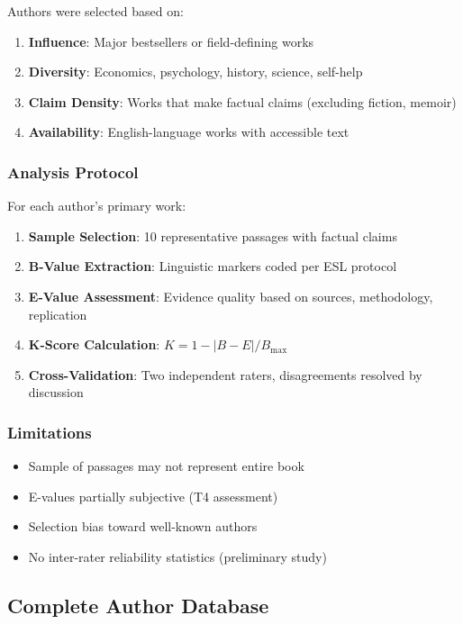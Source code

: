 \documentclass[11pt,a4paper]{article}
\begin{document}
Authors were selected based on:
\begin{enumerate}
    \item \textbf{Influence}: Major bestsellers or field-defining works
    \item \textbf{Diversity}: Economics, psychology, history, science, self-help
    \item \textbf{Claim Density}: Works that make factual claims (excluding fiction, memoir)
    \item \textbf{Availability}: English-language works with accessible text
\end{enumerate}

\subsubsection{Analysis Protocol}

For each author's primary work:
\begin{enumerate}
    \item \textbf{Sample Selection}: 10 representative passages with factual claims
    \item \textbf{B-Value Extraction}: Linguistic markers coded per ESL protocol
    \item \textbf{E-Value Assessment}: Evidence quality based on sources, methodology, replication
    \item \textbf{K-Score Calculation}: $K = 1 - |B - E| / B_{\max}$
    \item \textbf{Cross-Validation}: Two independent raters, disagreements resolved by discussion
\end{enumerate}

\subsubsection{Limitations}

\begin{itemize}
    \item Sample of passages may not represent entire book
    \item E-values partially subjective (T4 assessment)
    \item Selection bias toward well-known authors
    \item No inter-rater reliability statistics (preliminary study)
\end{itemize}

\subsection{Complete Author Database}
\end{document}
